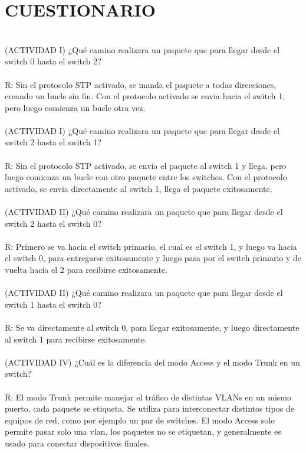 \documentclass[onecolumn,12pt]{IEEEtran}
\begin{document}
\section{CUESTIONARIO}
\hfill \\
(ACTIVIDAD I) ¿Qué camino realizara un paquete que para llegar desde el switch 0 hasta el
switch 2?\\ \\
R: Sin el protocolo STP activado, se manda el paquete a todas direcciones, creando un bucle sin fin. Con el protocolo activado se envia hacia el switch 1, pero luego comienza un bucle otra vez.
\\ \\
(ACTIVIDAD I) ¿Qué camino realizara un paquete que para llegar desde el switch 2 hasta el
switch 1?\\ \\
R: Sin el protocolo STP activado, se envia el paquete al switch 1 y llega, pero luego comienza un bucle con otro paquete entre los switches. Con el protocolo activado, se envia directamente al switch 1, llega el paquete exitosamente.
\\ \\
(ACTIVIDAD II) ¿Qué camino realizara un paquete que para llegar desde el switch 2 hasta el
switch 0?\\ \\
R: Primero se va hacia el switch primario, el cual es el switch 1, y luego va hacia el switch 0, para entregarse exitosamente y luego pasa por el switch primario y de vuelta hacia el 2 para recibirse exitosamente.
\\ \\
(ACTIVIDAD II) ¿Qué camino realizara un paquete que para llegar desde el switch 1 hasta el
switch 0?\\ \\
R: Se va directamente al switch 0, para llegar exitosamente, y luego directamente al switch 1 para recibirse exitosamente.
\\ \\
(ACTIVIDAD IV) ¿Cuál es la diferencia del modo Access y el modo Trunk en un switch?\\ \\
R: El modo Trunk permite manejar el tráfico de distintas VLANs en un mismo puerto, cada paquete se etiqueta. Se utiliza para interconectar distintos tipos de equipos de red, como por ejemplo un par de switches. El modo Access solo permite pasar solo una vlan, los paquetes no se etiquetan, y generalmente es usado para conectar dispositivos finales.
\end{document}

